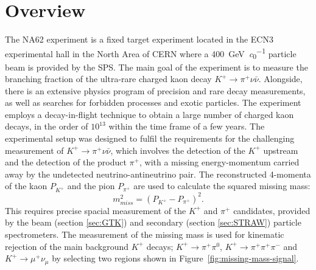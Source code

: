 \documentclass[../../main.tex]{subfiles}
\begin{document}
    \glsresetall
    \section{Overview}
    The NA62 experiment is a fixed target experiment located in the ECN3 experimental hall in the North Area of CERN where a \SI{400}{\giga\electronvolt\per\clight} particle beam is provided by the \gls{SPS}. The main goal of the experiment is to measure the 
    branching fraction of the ultra-rare charged kaon decay $K^+ \rightarrow \pi^+ \nu \bar{\nu}$. Alongside, there is an extensive physics program of 
    precision and rare decay measurements, as well as searches for forbidden processes and exotic particles.  
    \newline\indent The experiment employs a decay-in-flight technique to obtain a large number of charged kaon decays, in the order of $10^{13}$ within the time frame of a 
    few years. The experimental setup was designed to fulfil the requirements for the challenging measurement of $K^+ \rightarrow \pi^{+} \nu \bar{\nu}$, which involves the 
    detection of the $K^{+}$ upstream and the detection of the product $\pi^{+}$, with a missing energy-momentum carried away by the undetected neutrino-antineutrino pair. 
    The reconstructed 4-momenta of the kaon $P_{K^{+}}$ and the pion $P_{\pi^{+}}$ are used to calculate the squared missing mass:
    \begin{equation}\label{eq:missingmass}
        m_{miss}^2 = (P_{K^{+}} - P_{\pi^{+}})^2.
    \end{equation} 
    This requires precise spacial measurement of the $K^{+}$ and $\pi^{+}$ candidates, provided by the beam (section \ref{sec:GTK}) and secondary (section \ref{sec:STRAW}) particle spectrometers. 
    The measurement of the missing mass is used for kinematic rejection of the main background $K^{+}$ decays; $K^+ \rightarrow \pi^{+} \pi^{0}$, $K^+ \rightarrow \pi^{+} \pi^{+} \pi^{-} $ and $K^+ \rightarrow \mu^{+} \nu_{\mu}$ by selecting two regions shown in Figure~\ref{fig:missing-mass-signal}.
    
\end{document}
